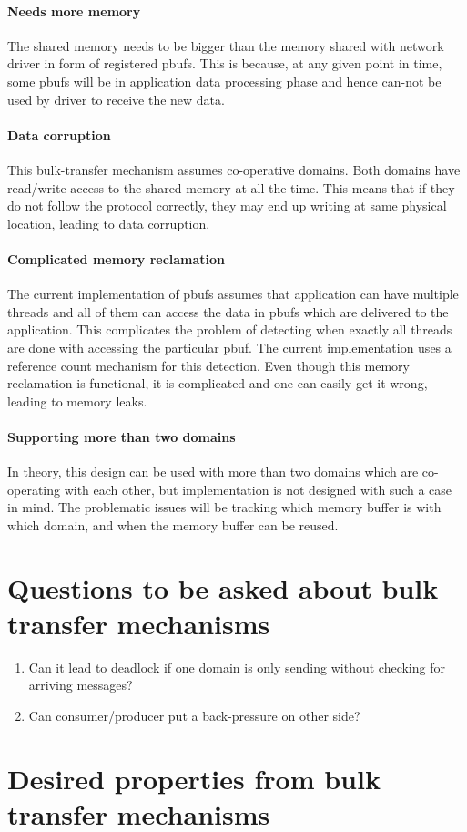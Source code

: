 \documentclass[a4paper,twoside]{report} %
\begin{document}
\paragraph{Needs more memory}
The shared memory needs to be bigger than the memory shared with
network driver in form of registered pbufs.  This is because, at any
given point in time, some pbufs will be in application data processing
phase and hence can-not be used by driver to receive the new data.

\paragraph{Data corruption}
This bulk-transfer mechanism assumes co-operative domains.  Both
domains have read/write access to the shared memory at all the time.
This means that if they do not follow the protocol correctly, they may
end up writing at same physical location, leading to data corruption.

\paragraph{Complicated memory reclamation}
The current implementation of pbufs assumes that application can have
multiple threads and all of them can access the data in pbufs which
are delivered to the application.  This complicates the problem of
detecting when exactly all threads are done with accessing the
particular pbuf.  The current implementation uses a reference count
mechanism for this detection.  Even though this memory reclamation is
functional, it is complicated and one can easily get it wrong, leading
to memory leaks.

\paragraph{Supporting more than two domains}
In theory, this design can be used with more than two domains which
are co-operating with each other, but implementation is not designed
with such a case in mind.  The problematic issues will be tracking
which memory buffer is with which domain, and when the memory buffer
can be reused.

\section{Questions to be asked about bulk transfer mechanisms}
\begin{enumerate}
  \item Can it lead to deadlock if one domain is only sending without
  checking for arriving messages?
  \item Can consumer/producer put a back-pressure on other side?
\end{enumerate}

\section{Desired properties from bulk transfer mechanisms}
\end{document}
